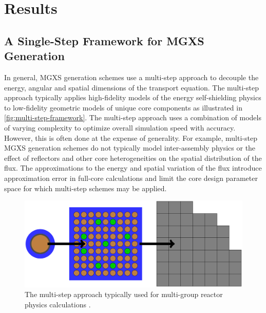 \section{Results}
\label{sec:results}


\subsection{A Single-Step Framework for MGXS Generation}
\label{sec:single-step}

In general, MGXS generation schemes use a multi-step approach to decouple the energy, angular and spatial dimensions of the transport equation. The multi-step approach typically applies high-fidelity models of the energy self-shielding physics to low-fidelity geometric models of unique core components as illustrated in \autoref{fig:multi-step-framework}. The multi-step approach uses a combination of models of varying complexity to optimize overall simulation speed with accuracy. However, this is often done at the expense of generality. For example, multi-step MGXS generation schemes do not typically model inter-assembly physics or the effect of reflectors and other core heterogeneities on the spatial distribution of the flux. The approximations to the energy and spatial variation of the flux introduce approximation error in full-core calculations and limit the core design parameter space for which multi-step schemes may be applied. 

\begin{figure}[h!]
\centering
\includegraphics[width=0.8\linewidth]{figures/multi-step-flow-chart}
\caption{The multi-step approach typically used for multi-group reactor physics calculations \cite{gibson2016thesis}.}
\label{fig:multi-step-framework}
\end{figure}

